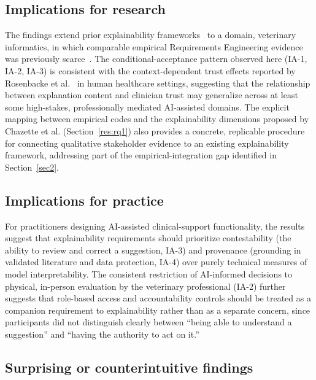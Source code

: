 \documentclass[pdflatex,sn-mathphys-num,Numbered]{sn-jnl}
\begin{document}
\subsection{Implications for research}\label{disc:research}

The findings extend prior explainability frameworks~\cite{chazette2020,chazette2021,chazette2022} to a domain, veterinary informatics, in which comparable empirical Requirements Engineering evidence was previously scarce~\cite{lustgarten2020}. The conditional-acceptance pattern observed here (IA-1, IA-2, IA-3) is consistent with the context-dependent trust effects reported by Rosenbacke et al.~\cite{rosenbacke2024} in human healthcare settings, suggesting that the relationship between explanation content and clinician trust may generalize across at least some high-stakes, professionally mediated AI-assisted domains. The explicit mapping between empirical codes and the explainability dimensions proposed by Chazette et al. (Section~\ref{res:rq1}) also provides a concrete, replicable procedure for connecting qualitative stakeholder evidence to an existing explainability framework, addressing part of the empirical-integration gap identified in Section~\ref{sec2}.

\subsection{Implications for practice}\label{disc:practice}

For practitioners designing AI-assisted clinical-support functionality, the results suggest that explainability requirements should prioritize contestability (the ability to review and correct a suggestion, IA-3) and provenance (grounding in validated literature and data protection, IA-4) over purely technical measures of model interpretability. The consistent restriction of AI-informed decisions to physical, in-person evaluation by the veterinary professional (IA-2) further suggests that role-based access and accountability controls should be treated as a companion requirement to explainability rather than as a separate concern, since participants did not distinguish clearly between ``being able to understand a suggestion'' and ``having the authority to act on it.''

\subsection{Surprising or counterintuitive findings}\label{disc:surprising}
\end{document}

